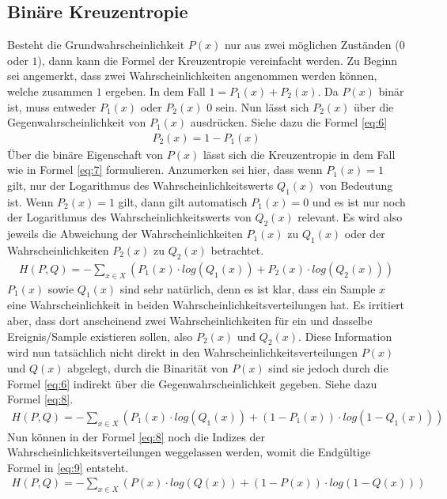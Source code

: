 \subsection{Binäre Kreuzentropie}\label{anhang:binary:kreuzentropie}
Besteht die Grundwahrscheinlichkeit $P(x)$ nur aus zwei möglichen Zuständen ($0$ oder $1$), dann kann die Formel der Kreuzentropie
vereinfacht werden. Zu Beginn sei angemerkt, dass zwei Wahrscheinlichkeiten angenommen werden können, welche zusammen
$1$ ergeben. In dem Fall $1 = P_1(x) + P_2(x)$. Da $P(x)$ binär ist, muss entweder $P_1(x)$ oder $P_2(x)$ $0$ sein.
Nun lässt sich $P_2(x)$ über die Gegenwahrscheinlichkeit von $P_1(x)$ ausdrücken. Siehe dazu die Formel \ref{eq:6}
\begin{align}
    P_2(x) = 1 - P_1(x)\label{eq:6}
\end{align}
Über die binäre Eigenschaft von $P(x)$ lässt sich die Kreuzentropie in dem Fall wie in Formel \ref{eq:7} formulieren.
Anzumerken sei hier, dass wenn $P_1(x) = 1$ gilt, nur der Logarithmus des Wahrscheinlichkeitswerts $Q_1(x)$ von Bedeutung ist.
Wenn $P_2(x) = 1$ gilt, dann gilt automatisch $P_1(x) = 0$ und es ist nur noch der Logarithmus des Wahrscheinlichkeitswerts von
$Q_2(x)$ relevant. Es wird also jeweils die Abweichung der Wahrscheinlichkeiten $P_1(x)$ zu $Q_1(x)$ oder der Wahrscheinlichkeiten
$P_2(x)$ zu $Q_2(x)$ betrachtet.
\begin{align}
    H(P,Q) = - \sum_{x \in X} (P_1(x) \cdot log(Q_1(x)) + P_2(x) \cdot log(Q_2(x)))\label{eq:7}
\end{align}
$P_1(x)$ sowie $Q_1(x)$ sind sehr natürlich, denn es ist klar, dass ein Sample $x$ eine Wahrscheinlichkeit
in beiden Wahrscheinlichkeitsverteilungen hat. Es irritiert aber, dass dort anscheinend zwei Wahrscheinlichkeiten für ein und
dasselbe Ereignis/Sample existieren sollen, also $P_2(x)$ und $Q_2(x)$. Diese Information wird nun tatsächlich nicht direkt in den
Wahrscheinlichkeitsverteilungen $P(x)$ und $Q(x)$ abgelegt, durch die Binarität von $P(x)$ sind sie jedoch durch die Formel
\ref{eq:6} indirekt über die Gegenwahrscheinlichkeit gegeben. Siehe dazu Formel \ref{eq:8}.
\begin{align}
    H(P,Q) = - \sum_{x \in X} (P_1(x) \cdot log(Q_1(x)) + (1 - P_1(x)) \cdot log(1 - Q_1(x)))\label{eq:8}
\end{align}
Nun können in der Formel \ref{eq:8} noch die Indizes der Wahrscheinlichkeitsverteilungen weggelassen werden, womit
die Endgültige Formel in \ref{eq:9} entsteht.
\begin{align}
    H(P,Q) = - \sum_{x \in X} (P(x) \cdot log(Q(x)) + (1 - P(x)) \cdot log(1 - Q(x)))\label{eq:9}
\end{align}
